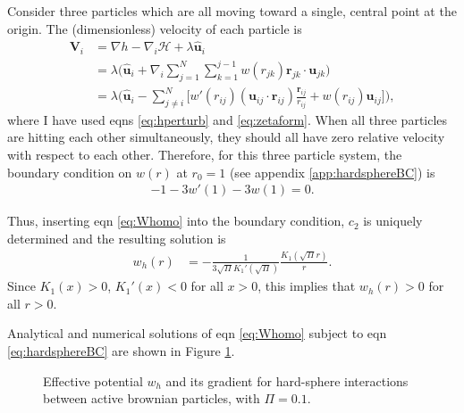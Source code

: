 \documentclass[twocolumn,amsmath,amssymb,aps]{revtex4-1}%
\begin{document}
Consider three particles which are all moving toward a single, central point at
the origin.
The (dimensionless) velocity of each particle is
\begin{align}\label{eq:3hardspherevelocities}
  \bm{V}_i
  &=\nabla h -\nabla_i\mathcal{H} + \lambda \bm{\hat{u}}_i\nonumber\\
  &=\lambda \bigg(\bm{\hat{u}}_i+\nabla_i\sum_{j=1}^N\sum_{k=1}^{j-1}w(r_{jk})
  \bm{r}_{jk}\cdot\bm{u}_{jk}\bigg)\nonumber\\
  &=\lambda \bigg(\bm{\hat{u}}_i-\sum_{j\neq i}^N \bigg[w'(r_{ij})
    (\bm{u}_{ij}\cdot\bm{r}_{ij})\frac{\bm{r}_{ij}}{r_{ij}}
    +w(r_{ij})\bm{u}_{ij}\bigg]\bigg),
\end{align}
where I have used eqns \ref{eq:hperturb} and \ref{eq:zetaform}. When all three
particles are hitting each other simultaneously, they should all have zero
relative velocity with respect to each other. Therefore, for this three
particle system, the boundary condition on $w(r)$ at $r_0=1$ (see appendix
\ref{app:hardsphereBC}) is
\begin{align}\label{eq:hardsphereBC}
  -1-3w'(1)-3w(1)=0.
\end{align}


Thus, inserting eqn \ref{eq:Whomo} into the boundary condition, $c_2$ is
uniquely determined and the resulting solution is
\begin{align}
  w_h(r) &= -\frac{1}{3\sqrt{\Pi}K_1'(\sqrt{\Pi})}\frac{K_1(\sqrt{\Pi}r)}{r}.
\end{align}
Since $K_1(x)>0$, $K_1'(x)<0$ for all $x>0$, this implies that $w_h(r)>0$
for all $r>0$.

Analytical and numerical solutions of eqn \ref{eq:Whomo} subject to eqn
\ref{eq:hardsphereBC} are shown in Figure \ref{fig:1}.

\begin{figure}[!t]
  \subfloat{\label{fig:1b}}
  \caption{\protect{} Effective potential $w_h$ and
    \protect{} its gradient for hard-sphere interactions between
    active brownian particles, with $\Pi=0.1$.}\label{fig:1}
\end{figure}
\end{document}
